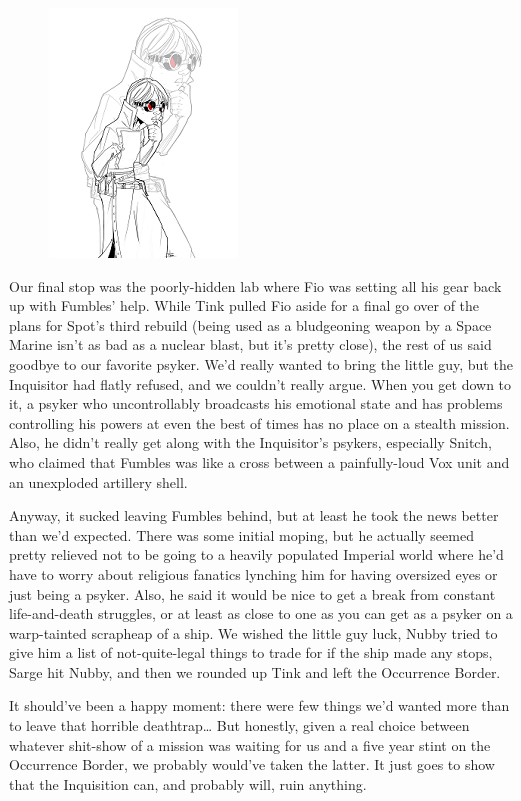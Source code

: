 \begin{figure}
	\begin{center}
		\includegraphics[width=\figwidth]{pics/17/19.png}
	\end{center}
\end{figure}
Our final stop was the poorly-hidden lab where Fio was setting all his gear back up with Fumbles' help. 
While Tink pulled Fio aside for a final go over of the plans for Spot's third rebuild (being used as a bludgeoning weapon by a Space Marine isn't as bad as a nuclear blast, but it's pretty close), the rest of us said goodbye to our favorite psyker. 
We'd really wanted to bring the little guy, but the Inquisitor had flatly refused, and we couldn't really argue. 
When you get down to it, a psyker who uncontrollably broadcasts his emotional state and has problems controlling his powers at even the best of times has no place on a stealth mission. 
Also, he didn't really get along with the Inquisitor's psykers, especially Snitch, who claimed that Fumbles was like a cross between a painfully-loud Vox unit and an unexploded artillery shell.

Anyway, it sucked leaving Fumbles behind, but at least he took the news better than we'd expected. 
There was some initial moping, but he actually seemed pretty relieved not to be going to a heavily populated Imperial world where he'd have to worry about religious fanatics lynching him for having oversized eyes or just being a psyker. 
Also, he said it would be nice to get a break from constant life-and-death struggles, or at least as close to one as you can get as a psyker on a warp-tainted scrapheap of a ship. 
We wished the little guy luck, Nubby tried to give him a list of not-quite-legal things to trade for if the ship made any stops, Sarge hit Nubby, and then we rounded up Tink and left the Occurrence Border. 


It should've been a happy moment: 
there were few things we'd wanted more than to leave that horrible deathtrap… But honestly, given a real choice between whatever shit-show of a mission was waiting for us and a five year stint on the Occurrence Border, we probably would've taken the latter. 
It just goes to show that the Inquisition can, and probably will, ruin anything.

